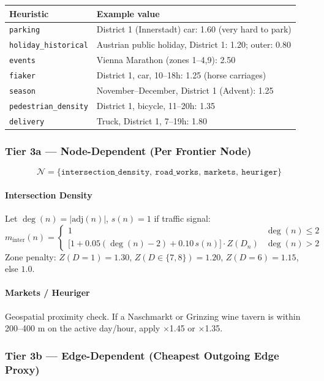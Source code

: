 \documentclass[11pt,a4paper]{article}
\begin{document}
\begin{table}[H]
\centering\small
\begin{tabular}{ll}
\toprule
\textbf{Heuristic} & \textbf{Example value} \\
\midrule
\texttt{parking} & District 1 (Innerstadt) car: 1.60 (very hard to park) \\
\texttt{holiday\_historical} & Austrian public holiday, District 1: 1.20; outer: 0.80 \\
\texttt{events} & Vienna Marathon (zones 1–4,9): 2.50 \\
\texttt{fiaker} & District 1, car, 10–18h: 1.25 (horse carriages) \\
\texttt{season} & November–December, District 1 (Advent): 1.25 \\
\texttt{pedestrian\_density} & District 1, bicycle, 11–20h: 1.35 \\
\texttt{delivery} & Truck, District 1, 7–19h: 1.80 \\
\bottomrule
\end{tabular}
\end{table}

\subsubsection{Tier 3a — Node-Dependent (Per Frontier Node)}

\[
\mathcal{N} = \{\texttt{intersection\_density},\ \texttt{road\_works},\ \texttt{markets},\ \texttt{heuriger}\}
\]

\paragraph{Intersection Density} Let $\deg(n) = |\mathrm{adj}(n)|$, $s(n)=1$ if traffic signal:
\[
m_{\text{inter}}(n) =
\begin{cases}
1 & \deg(n)\le 2 \\
\bigl[1 + 0.05(\deg(n)-2) + 0.10\,s(n)\bigr]\cdot Z(D_n) & \deg(n)>2
\end{cases}
\]
Zone penalty: $Z(D=1)=1.30$, $Z(D\in\{7,8\})=1.20$, $Z(D=6)=1.15$, else $1.0$.

\paragraph{Markets / Heuriger} Geospatial proximity check. If a Naschmarkt or Grinzing wine tavern
is within 200–400 m on the active day/hour, apply $\times$1.45 or $\times$1.35.

\subsubsection{Tier 3b — Edge-Dependent (Cheapest Outgoing Edge Proxy)}
\end{document}
